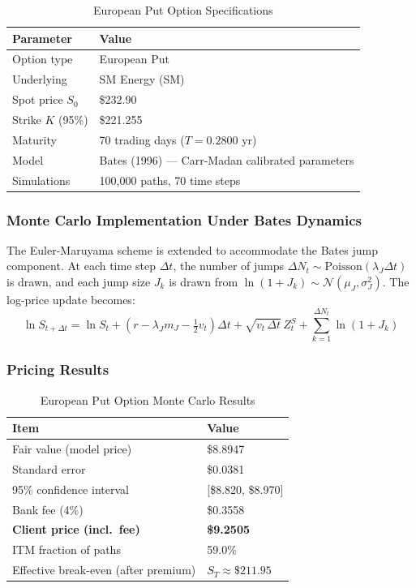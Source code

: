 \documentclass[12pt,a4paper]{article}
\newcommand{\thead}[1]{\cellcolor{headernavy}\color{white}\textbf{#1}}
\newcommand{\rowA}{\rowcolor{white}}
\newcommand{\rowB}{\rowcolor{rowgray}}
\begin{document}
\begin{table}[H]
  \centering
  \caption{European Put Option Specifications}
  \label{tab:put_spec}
  \begin{tabular}{ll}
    \hline
    \thead{Parameter} & \thead{Value} \\
    \hline
    \rowA Option type      & European Put \\
    \rowB Underlying       & SM Energy (SM) \\
    \rowA Spot price $S_0$ & \$232.90 \\
    \rowB Strike $K$ (95\%)& \$221.255 \\
    \rowA Maturity         & 70 trading days ($T = 0.2800$ yr) \\
    \rowB Model            & Bates (1996) --- Carr-Madan calibrated parameters \\
    \rowA Simulations      & 100,000 paths, 70 time steps \\
    \hline
  \end{tabular}
\end{table}

\subsubsection{Monte Carlo Implementation Under Bates Dynamics}

The Euler-Maruyama scheme is extended to accommodate the Bates jump component. At each time step $\Delta t$, the number of jumps $\Delta N_t \sim \text{Poisson}(\lambda_J \Delta t)$ is drawn, and each jump size $J_k$ is drawn from $\ln(1 + J_k) \sim \mathcal{N}(\mu_J, \sigma_J^2)$. The log-price update becomes:
\[
  \ln S_{t+\Delta t} = \ln S_t + \left(r - \lambda_J m_J - \tfrac{1}{2}v_t\right)\Delta t + \sqrt{v_t\,\Delta t}\,Z_t^S + \sum_{k=1}^{\Delta N_t}\ln(1+J_k)
\]

\subsubsection{Pricing Results}

\begin{table}[H]
  \centering
  \caption{European Put Option Monte Carlo Results}
  \label{tab:put_results}
  \begin{tabular}{ll}
    \hline
    \thead{Item} & \thead{Value} \\
    \hline
    \rowA Fair value (model price)           & \$8.8947 \\
    \rowB Standard error                     & \$0.0381 \\
    \rowA 95\% confidence interval           & [\$8.820, \$8.970] \\
    \rowB Bank fee (4\%)                     & \$0.3558 \\
    \rowA \textbf{Client price (incl.\ fee)} & \textbf{\$9.2505} \\
    \hline
    \rowB ITM fraction of paths              & 59.0\% \\
    \rowA Effective break-even (after premium) & $S_T \approx \$211.95$ \\
    \hline
  \end{tabular}
\end{table}
\end{document}
